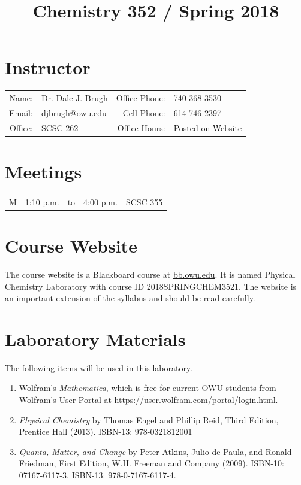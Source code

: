 \documentclass[letterpaper,oneside,onecolumn,11pt,article]{memoir}
\title{Chemistry 352 / Spring 2018}
\date{}
\author{}
\begin{document}
\maketitle
\thispagestyle{courseinformationtitle}
%
%
\section{Instructor}
\begin{tabular}{rl|rl}
Name: & Dr. Dale J. Brugh & Office Phone: & 740-368-3530 \\
Email: & \href{mailto:djbrugh@owu.edu}{djbrugh@owu.edu} & Cell Phone: & 614-746-2397 \\
Office: & SCSC 262 & Office Hours: & Posted on Website \\
\end{tabular}
%
%
\section{Meetings}
\begin{tabular}{crcrl}
M & 1:10 p.m. & to & 4:00 p.m. & SCSC 355 \\
\end{tabular}

\section{Course Website}
The course website is a Blackboard course at \href{https://bb.owu.edu}{bb.owu.edu}. It is named Physical Chemistry Laboratory with course ID 2018SPRINGCHEM3521. The website is an important extension of the syllabus and should be read carefully.

\section{Laboratory Materials}
The following items will be used in this laboratory. 
\begin{enumerate}[1.]
\item Wolfram's \emph{Mathematica}, which is free for current OWU students from \href{https://user.wolfram.com/portal/login.html}{Wolfram's User Portal} at \href{https://user.wolfram.com/portal/login.html}{https://user.wolfram.com/portal/login.html}. 
\item \emph{Physical Chemistry} by Thomas Engel and Phillip Reid, Third Edition, Prentice Hall (2013).  ISBN-13: 978-0321812001
\item \emph{Quanta, Matter, and Change} by Peter Atkins, Julio de Paula, and Ronald Friedman, First Edition, W.H. Freeman and Company (2009). ISBN-10: 07167-6117-3, ISBN-13: 978-0-7167-6117-4.
\end{enumerate}
\end{document}
